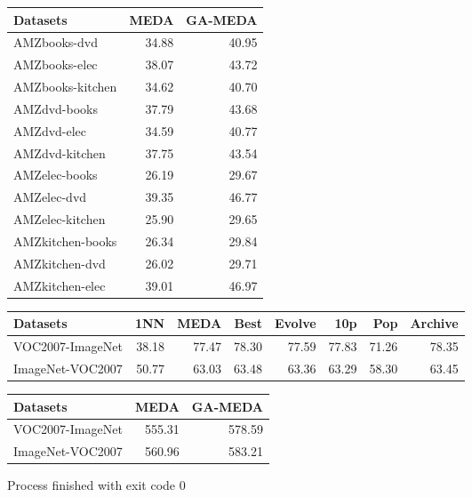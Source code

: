 \documentclass[a4paper]{article}
\begin{document}
	\begin{tabular}{lrr}
		\toprule
		Datasets &   MEDA &  GA-MEDA \\
		\midrule
		AMZbooks-dvd &  34.88 &    40.95 \\
		AMZbooks-elec &  38.07 &    43.72 \\
		AMZbooks-kitchen &  34.62 &    40.70 \\
		AMZdvd-books &  37.79 &    43.68 \\
		AMZdvd-elec &  34.59 &    40.77 \\
		AMZdvd-kitchen &  37.75 &    43.54 \\
		AMZelec-books &  26.19 &    29.67 \\
		AMZelec-dvd &  39.35 &    46.77 \\
		AMZelec-kitchen &  25.90 &    29.65 \\
		AMZkitchen-books &  26.34 &    29.84 \\
		AMZkitchen-dvd &  26.02 &    29.71 \\
		AMZkitchen-elec &  39.01 &    46.97 \\
		\bottomrule
	\end{tabular}
	
	\begin{tabular}{lrrrrrrr}
		\toprule
		Datasets &    1NN &   MEDA &   Best &  Evolve &    10p &    Pop &  Archive \\
		\midrule
		VOC2007-ImageNet &  38.18 &  77.47 &  78.30 &   77.59 &  77.83 &  71.26 &    78.35 \\
		ImageNet-VOC2007 &  50.77 &  63.03 &  63.48 &   63.36 &  63.29 &  58.30 &    63.45 \\
		\bottomrule
	\end{tabular}
	
	\begin{tabular}{lrr}
		\toprule
		Datasets &    MEDA &  GA-MEDA \\
		\midrule
		VOC2007-ImageNet &  555.31 &   578.59 \\
		ImageNet-VOC2007 &  560.96 &   583.21 \\
		\bottomrule
	\end{tabular}
	
	
	Process finished with exit code 0
	
\end{document}

